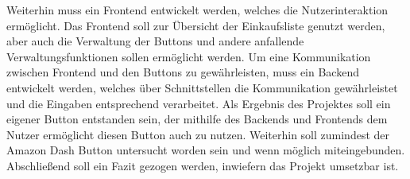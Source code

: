 Weiterhin muss ein Frontend entwickelt werden, welches die Nutzerinteraktion ermöglicht. Das Frontend soll zur Übersicht der Einkaufsliste genutzt werden, aber auch die Verwaltung der Buttons und andere anfallende Verwaltungsfunktionen sollen ermöglicht werden. 
Um eine Kommunikation zwischen Frontend und den Buttons zu gewährleisten, muss ein Backend entwickelt werden, welches über Schnittstellen die Kommunikation gewährleistet und die Eingaben entsprechend verarbeitet. 
Als Ergebnis des Projektes soll ein eigener Button entstanden sein, der mithilfe des Backends und Frontends dem Nutzer ermöglicht diesen Button auch zu nutzen. Weiterhin soll zumindest der Amazon Dash Button untersucht worden sein und wenn möglich miteingebunden. Abschließend soll ein Fazit gezogen werden, inwiefern das Projekt umsetzbar ist. 
